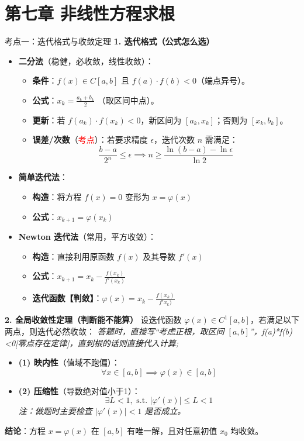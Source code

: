 \documentclass[12pt, a4paper]{article}
\begin{document}
\section*{第七章 非线性方程求根}
\begin{knowpoint}{考点一：迭代格式与收敛定理}
    \textbf{1. 迭代格式（公式怎么选）}
    \begin{itemize}
        \item \textbf{二分法}（稳健，必收敛，线性收敛）：
        \begin{itemize}
            \item \textbf{条件}：$f(x) \in C[a,b]$ 且 $f(a) \cdot f(b) < 0$（端点异号）。
            \item \textbf{公式}：$x_{k} = \frac{a_k + b_k}{2}$ （取区间中点）。
            \item \textbf{更新}：若 $f(a_k) \cdot f(x_k) < 0$，新区间为 $[a_k, x_k]$；否则为 $[x_k, b_k]$。
            \item \textbf{误差/次数}（\textcolor{red}{考点}）：若要求精度 $\epsilon$，迭代次数 $n$ 需满足：
            \[ \frac{b-a}{2^n} \le \epsilon \implies n \ge \frac{\ln(b-a) - \ln \epsilon}{\ln 2} \]
        \end{itemize}
        
        \item \textbf{简单迭代法}：
        \begin{itemize}
            \item \textbf{构造}：将方程 $f(x)=0$ 变形为 $x = \varphi(x)$
            \item \textbf{公式}：$x_{k+1} = \varphi(x_k)$
        \end{itemize}
        
        \item \textbf{Newton 迭代法}（常用，平方收敛）：
        \begin{itemize}
            \item \textbf{构造}：直接利用原函数 $f(x)$ 及其导数 $f'(x)$
            \item \textbf{公式}：$x_{k+1} = x_k - \frac{f(x_k)}{f'(x_k)}$
             \item \textbf{迭代函数【判敛】}：$\varphi(x) = x_k - \frac{f(x_k)}{f'x_k)}$
        \end{itemize}
    \end{itemize}

    \textbf{2. 全局收敛性定理（判断能不能算）}
    设迭代函数 $\varphi(x) \in C^1[a,b]$，若满足以下两点，则迭代必然收敛：
        \textit{答题时，直接写“考虑正根，取区间 $[a, b]$”，f(a)*f(b)<0[零点存在定律]，直到根的话则直接代入计算;}
    \begin{itemize}
        \item \textbf{(1) 映内性}（值域不跑偏）：
        \[ \forall x \in [a,b] \implies \varphi(x) \in [a,b] \]
        \item \textbf{(2) 压缩性}（导数绝对值小于1）：
        \[ \exists L < 1, \text{ s.t. } |\varphi'(x)| \le L < 1 \]
        \textit{注：做题时主要检查 $|\varphi'(x)| < 1$ 是否成立。}
    \end{itemize}
    \textbf{结论}：方程 $x=\varphi(x)$ 在 $[a,b]$ 有唯一解，且对任意初值 $x_0$ 均收敛。
\end{knowpoint}
\end{document}
